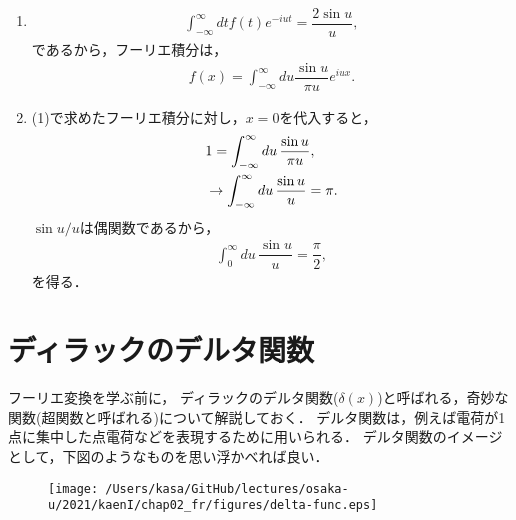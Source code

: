 \begin{enumerate}[(1)]
  \item
	\begin{align}
	  \int_{-\infty}^{\infty}dt f(t)e^{-iut} = \dfrac{2\sin u}{u},
	\end{align}
      であるから，フーリエ積分は，
       \begin{align}
	 f(x) = \int_{-\infty}^{\infty}du\dfrac{\sin u}{\pi u}e^{iux}. 
       \end{align}
  \item (1)で求めたフーリエ積分に対し，$x=0$を代入すると，
	\begin{align}
	  & 1 = \int_{-\infty}^{\infty}du\, \dfrac{\sin u}{\pi u}, \notag \\
          &\rightarrow \int_{-\infty}^{\infty}du\, \dfrac{\sin u}{ u} = \pi.
	\end{align}
	$\sin u/u$は偶関数であるから，
	\begin{align}
	 \int_{0}^{\infty}du\, \dfrac{\sin u}{ u} = \dfrac{\pi}{2}, 
	\end{align}
	を得る．
\end{enumerate}
%
\newpage
%
\section{ディラックのデルタ関数}
%
フーリエ変換を学ぶ前に，
ディラックのデルタ関数($\delta (x)$)と呼ばれる，奇妙な関数(超関数と呼ばれる)について解説しておく．
デルタ関数は，例えば電荷が1点に集中した点電荷などを表現するために用いられる．
デルタ関数のイメージとして，下図のようなものを思い浮かべれば良い．
\begin{figure}[htbp]
 \vspace*{-\intextsep}
 \centering
 \texttt{[image: /Users/kasa/GitHub/lectures/osaka-u/2021/kaenI/chap02\_fr/figures/delta-func.eps]} 
\end{figure}

